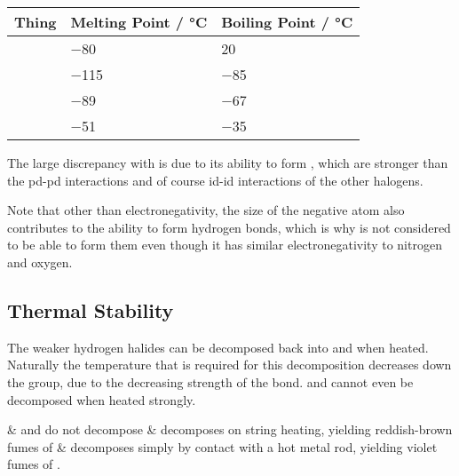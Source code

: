			\begin{center}\begin{table}[htb]\renewcommand{\arraystretch}{1.5}
			\begin{tabu} to \textwidth {X[c,m] | X[c,m] | X[c,m]}

				Thing		&	Melting Point / \si{\celsius}	&	Boiling Point / \si{\celsius}	\\	\hline
						&	\num{-80}						&	\num{20}						\\	\hline
					&	\num{-115}						&	\num{-85}						\\	\hline
					&	\num{-89}						&	\num{-67}						\\	\hline
						&	\num{-51}						&	\num{-35}						\\	\hline

			\end{tabu}
			\end{table}\end{center}\vspace{-10mm}

			The large discrepancy with  is due to its ability to form , which are stronger than the pd-pd interactions
			and of course id-id interactions of the other halogens.

			Note that other than electronegativity, the size of the negative atom also contributes to the ability to form hydrogen bonds, which
			is why  is not considered to be able to form them even though it has similar electronegativity to nitrogen and oxygen.





		\subsection{Thermal Stability}

			The weaker hydrogen halides can be decomposed back into  and  when heated. Naturally the temperature that is required
			for this decomposition decreases down the group, due to the decreasing strength of the  bond.
			 and  cannot even be decomposed when heated strongly.

			\begin{bulletlist}
				&  and  do not decompose
				&  decomposes on string heating, yielding reddish-brown fumes of 
				&  decomposes simply by contact with a hot metal rod, yielding violet fumes of .
			\end{bulletlist}

